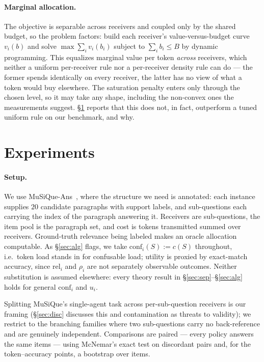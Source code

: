 \documentclass[sigconf,anonymous]{aamas}
\theoremstyle{remark}
\begin{document}
\paragraph{Marginal allocation.} The objective is separable across
receivers and coupled only by the shared budget, so the problem
factors: build each receiver's value-versus-budget curve $v_i(b)$ and
solve $\max \sum_i v_i(b_i)$ subject to $\sum_i b_i \le B$ by dynamic
programming. This equalizes marginal value per token \emph{across}
receivers, which neither a uniform per-receiver rule nor a
per-receiver density rule can do --- the former spends identically on
every receiver, the latter has no view of what a token would buy
elsewhere. The saturation penalty enters only through the chosen
level, so it may take any shape, including the non-convex ones the
measurements suggest. \S\ref{sec:exp} reports that this does not, in
fact, outperform a tuned uniform rule on our benchmark, and why.

\section{Experiments}
\label{sec:exp}

\paragraph{Setup.} We use MuSiQue-Ans~\cite{musique2022}, where the
structure we need is annotated: each instance supplies $20$ candidate
paragraphs with support labels, and sub-questions each carrying the
index of the paragraph answering it. Receivers are sub-questions,
the item pool is the paragraph set, and cost is tokens transmitted
summed over receivers. Ground-truth relevance being labeled makes an
oracle allocation computable. As \S\ref{sec:alg} flags, we take
$\mathrm{conf}_i(S):=c(S)$ throughout, i.e.\ token load stands in for
confusable load; utility is proxied by exact-match accuracy, since
$\mathrm{rel}_i$ and $\rho_i$ are not separately observable outcomes.
Neither substitution is assumed elsewhere: every theory result in
\S\ref{sec:sep}--\S\ref{sec:alg} holds for general $\mathrm{conf}_i$
and $u_i$.

Splitting MuSiQue's single-agent task across per-sub-question receivers
is our framing (\S\ref{sec:disc} discusses this and contamination as
threats to validity); we restrict to the branching families where two
sub-questions carry no back-reference and are genuinely independent.
Comparisons are paired --- every policy answers the same items ---
using McNemar's exact test on discordant pairs and, for the
token--accuracy points, a bootstrap over items.
\end{document}
